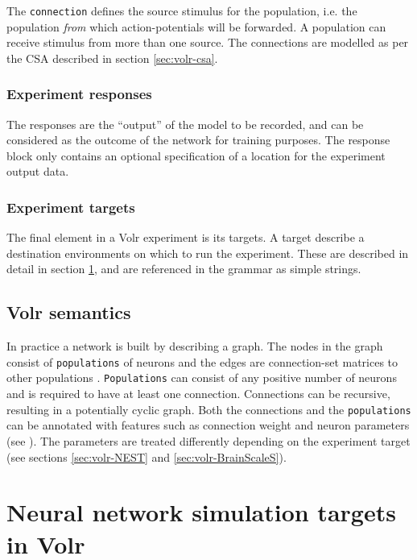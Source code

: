 \documentclass{report.tex}{subfiles}
\begin{document}
The \texttt{connection} defines the source stimulus for the population,
i.e. the population \textit{from} which action-potentials will be forwarded.
A population can receive stimulus from more than one source.
The connections are modelled as per the \gls{CSA} described in section
\ref{sec:volr-csa}.


\subsubsection{Experiment responses}
The responses are the ``output'' of the model to be recorded, and can be
considered as the outcome of the network for training purposes.
The response block only contains an optional specification of a location for
the experiment output data.

\subsubsection{Experiment targets}
The final element in a Volr experiment is its targets.
A target describe a destination environments on which to run the experiment.
These are described in detail in section \ref{sec:volr-targets}, and are
referenced in the grammar as simple strings.

\subsection{Volr semantics}
In practice a network is built by describing a graph.
The nodes in the graph consist of \texttt{populations} of neurons and the edges
are connection-set matrices to other populations \autocite{Djurfeldt2012}.
\texttt{Populations} can consist of any positive number of neurons and is
required to have at least one connection.
Connections can be recursive, resulting in a potentially cyclic graph.
Both the connections and the \texttt{populations} can be annotated with features
such as connection weight and neuron parameters (see ).
The parameters are treated differently depending on the experiment target (see
sections \ref{sec:volr-NEST} and \ref{sec:volr-BrainScaleS}).


\section{Neural network simulation targets in Volr} \label{sec:volr-targets}
\end{document}
